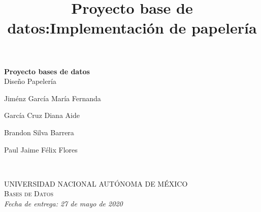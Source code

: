 \documentclass[30pt,fleqn]{article}
\begin{document}
\date{}

\begingroup
\thispagestyle{empty}
\centering
\vspace*{5cm}
\par\normalfont\fontsize{35}{35}\sffamily\selectfont
\textbf{Proyecto bases de datos}\\
{\Huge Diseño Papelería}\par %
\vspace*{1cm}
{\large Jiménz García María Fernanda }\par
{\large García Cruz Diana Aide}\par %
{\large Brandon Silva Barrera}\par
{\large Paul Jaime Félix Flores}\par

\endgroup



~\vfill
\thispagestyle{empty}

\noindent \textsc{UNIVERSIDAD NACIONAL AUTÓNOMA DE MÉXICO}\\

\noindent \textsc{Bases de Datos}\\ %

\noindent \textit{Fecha de entrega: 27 de mayo de 2020} 

\newpage
\pagestyle{empty} 

\tableofcontents %

\pagestyle{fancy} 


\newpage


\title{Proyecto base de datos:Implementación de papelería}
\end{document}
